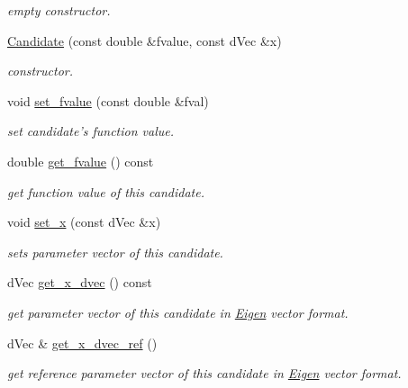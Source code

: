 \begin{DoxyCompactItemize}
\begin{DoxyCompactList}\small\item\em empty constructor. \end{DoxyCompactList}\item 
\hyperlink{classlibcmaes_1_1Candidate_aa15c585a460bcc7e0537b8f8defea205}{Candidate} (const double \&fvalue, const d\-Vec \&x)
\begin{DoxyCompactList}\small\item\em constructor. \end{DoxyCompactList}\item 
void \hyperlink{classlibcmaes_1_1Candidate_abdd1a7661c05f4cf236925bcf2b7f0cc}{set\-\_\-fvalue} (const double \&fval)
\begin{DoxyCompactList}\small\item\em set candidate's function value. \end{DoxyCompactList}\item 
double \hyperlink{classlibcmaes_1_1Candidate_aeca2ab3de5182036093745ec7f82834d}{get\-\_\-fvalue} () const 
\begin{DoxyCompactList}\small\item\em get function value of this candidate. \end{DoxyCompactList}\item 
void \hyperlink{classlibcmaes_1_1Candidate_a4a668920522fa13235fd7feb64aae6b8}{set\-\_\-x} (const d\-Vec \&x)
\begin{DoxyCompactList}\small\item\em sets parameter vector of this candidate. \end{DoxyCompactList}\item 
d\-Vec \hyperlink{classlibcmaes_1_1Candidate_a6155af392159bfc4d10722a7a0abf420}{get\-\_\-x\-\_\-dvec} () const 
\begin{DoxyCompactList}\small\item\em get parameter vector of this candidate in \hyperlink{namespaceEigen}{Eigen} vector format. \end{DoxyCompactList}\item 
d\-Vec \& \hyperlink{classlibcmaes_1_1Candidate_a2d007a084655a3d0f3176293f929bfdb}{get\-\_\-x\-\_\-dvec\-\_\-ref} ()
\begin{DoxyCompactList}\small\item\em get reference parameter vector of this candidate in \hyperlink{namespaceEigen}{Eigen} vector format. \end{DoxyCompactList}\item 

\end{DoxyCompactItemize}
